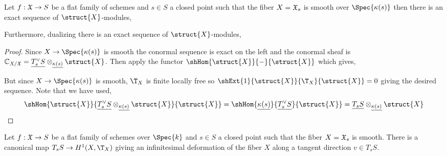 \documentclass[12pt]{article}
\begin{document}
\begin{cor}
Let $f : \mathfrak{X} \to S$ be a flat family of schemes and $s \in S$ a closed point such that the fiber $X = \mathfrak{X}_s$ is smooth over $\Spec{\kappa(s)}$ then there is an exact sequence of $\struct{X}$-modules,
\begin{center}
\end{center}
Furthermore, dualizing there is an exact sequence of $\struct{X}$-modules,
\begin{center}
\end{center}
\end{cor}

\begin{proof}
Since $X \to \Spec{\kappa(s)}$ is smooth the conormal sequence is exact on the left and the conormal sheaf is $\C_{X/\X} = \underline{T_s^\vee S} \otimes_{\underline{\kappa(s)}} \struct{X}$. Then apply the functor $\shHom{\struct{X}}{-}{\struct{X}}$ which gives,
\begin{center}
\end{center}
But since $X \to \Spec{\kappa(s)}$ is smooth, $\T_{X}$ is finite locally free so $\shExt{1}{\struct{X}}{\T_{X}}{\struct{X}} = 0$ giving the desired sequence. Note that we have used,
\[ \shHom{\struct{X}}{\underline{T_s^\vee S} \otimes_{\underline{\kappa(s)}} \struct{X}}{\struct{X}} = \shHom{\underline{\kappa(s)}}{\underline{T_s^\vee S}}{\struct{X}} = \underline{T_s S} \otimes_{\underline{\kappa(s)}} \struct{X} \]
\end{proof}

\begin{prop}
Let $f : \mathfrak{X} \to S$ be a flat family of schemes over $\Spec{k}$ and $s \in S$ a closed point such that the fiber $X = \mathfrak{X}_s$ is smooth. There is a canonical map $T_s S \to H^1(X, \T_{X})$ giving an infinitesimal deformation of the fiber $X$ along a tangent direction $v \in T_s S$.
\end{prop}
\end{document}
